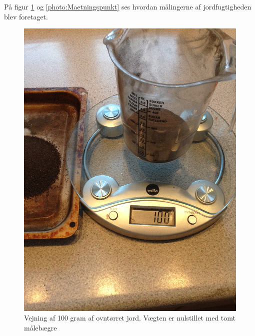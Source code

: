 På figur \ref{photo:Opvejning} og \ref{photo:Maetningspunkt} ses hvordan målingerne af jordfugtigheden blev foretaget. 

\begin{figure}[H]
	\centering 
	\includegraphics[scale=0.08]{HardwareArkitektur/Sensore/Jordfugt_billeder/Opvejning.JPG}
	\caption{Vejning af 100 gram af ovntørret jord. Vægten er nulstillet med tomt målebægre}
	\label{photo:Opvejning}
\end{figure}  
 
